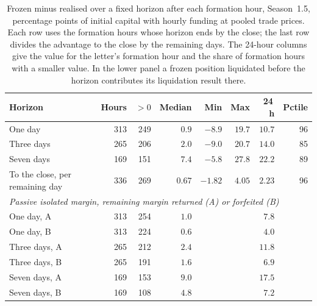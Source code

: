 \begin{table}[ht]
\centering\small
\caption{Frozen minus realised over a fixed horizon after each formation hour,
Season~1.5, percentage points of initial capital with hourly funding at
pooled trade prices. Each row uses the formation hours whose horizon ends by
the close; the last row divides the advantage to the close by the remaining
days. The 24-hour columns give the value for the letter's formation hour and
the share of formation hours with a smaller value. In the lower panel a
frozen position liquidated before the horizon contributes its liquidation
result there.}
\label{tab:orghorizon}
\setlength{\tabcolsep}{4pt}
\begin{tabular}{lrrrrrrr}
\toprule
Horizon & Hours & $>0$ & Median & Min & Max & 24\,h & Pctile \\
\midrule
One day & 313 & 249 & $0.9$ & $-8.9$ & $19.7$ & $10.7$ & 96 \\
Three days & 265 & 206 & $2.0$ & $-9.0$ & $20.7$ & $14.0$ & 85 \\
Seven days & 169 & 151 & $7.4$ & $-5.8$ & $27.8$ & $22.2$ & 89 \\
To the close, per remaining day & 336 & 269 & $0.67$ & $-1.82$ & $4.05$ & $2.23$ & 96 \\
\midrule
\multicolumn{8}{l}{\emph{Passive isolated margin, remaining margin returned (A) or forfeited (B)}} \\
One day, A & 313 & 254 & $1.0$ & & & $7.8$ & \\
One day, B & 313 & 224 & $0.6$ & & & $4.0$ & \\
Three days, A & 265 & 212 & $2.4$ & & & $11.8$ & \\
Three days, B & 265 & 191 & $1.6$ & & & $6.9$ & \\
Seven days, A & 169 & 153 & $9.0$ & & & $17.5$ & \\
Seven days, B & 169 & 108 & $4.8$ & & & $7.2$ & \\
\bottomrule
\end{tabular}
\end{table}
